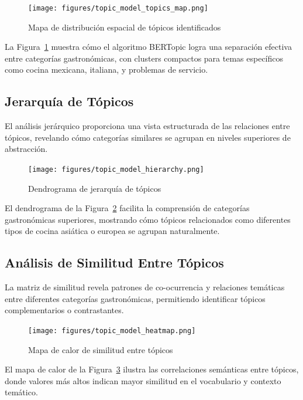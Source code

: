 \documentclass[12pt,a4paper,twoside,openany]{book}
\begin{document}
\begin{figure}[htbp]
\centering
\texttt{[image: figures/topic\_model\_topics\_map.png]}
\caption{Mapa de distribución espacial de tópicos identificados}
\label{fig:topic_model_topics_map}
\end{figure}

La Figura~\ref{fig:topic_model_topics_map} muestra cómo el algoritmo BERTopic logra una separación efectiva entre categorías gastronómicas, con clusters compactos para temas específicos como cocina mexicana, italiana, y problemas de servicio.

\subsection{Jerarquía de Tópicos}

El análisis jerárquico proporciona una vista estructurada de las relaciones entre tópicos, revelando cómo categorías similares se agrupan en niveles superiores de abstracción.

\begin{figure}[htbp]
\centering
\texttt{[image: figures/topic\_model\_hierarchy.png]}
\caption{Dendrograma de jerarquía de tópicos}
\label{fig:topic_model_hierarchy}
\end{figure}

El dendrograma de la Figura~\ref{fig:topic_model_hierarchy} facilita la comprensión de categorías gastronómicas superiores, mostrando cómo tópicos relacionados como diferentes tipos de cocina asiática o europea se agrupan naturalmente.

\subsection{Análisis de Similitud Entre Tópicos}

La matriz de similitud revela patrones de co-ocurrencia y relaciones temáticas entre diferentes categorías gastronómicas, permitiendo identificar tópicos complementarios o contrastantes.

\begin{figure}[htbp]
\centering
\texttt{[image: figures/topic\_model\_heatmap.png]}
\caption{Mapa de calor de similitud entre tópicos}
\label{fig:topic_model_heatmap}
\end{figure}

El mapa de calor de la Figura~\ref{fig:topic_model_heatmap} ilustra las correlaciones semánticas entre tópicos, donde valores más altos indican mayor similitud en el vocabulario y contexto temático.
\end{document}
